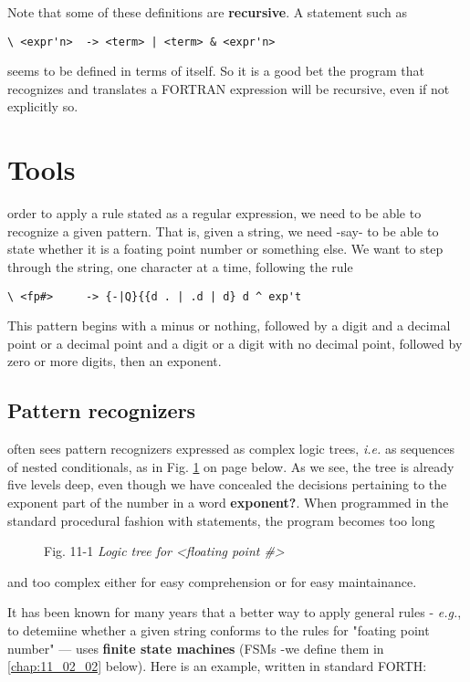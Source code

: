 Note that some of these definitions are \textbf{recursive}. A statement such as

\begin{verbatim}
\ <expr'n>  -> <term> | <term> & <expr'n>
\end{verbatim}

seems to be defined in terms of itself. So it is a good bet the program that recognizes and translates a FORTRAN expression will be recursive, even if not explicitly so.

\section{Tools}
 order to apply a rule stated as a regular expression, we need to be able to recognize a given pattern. That is, given a string, we need -say- to be able to state whether it is a foating point number or something else. We want to step through the string, one character at a time, following the rule

\begin{verbatim}
\ <fp#>     -> {-|Q}{{d . | .d | d} d ^ exp't
\end{verbatim}

This pattern begins with a minus or nothing, followed by a digit and a decimal point or a decimal point and a digit or a digit with no decimal point, followed by zero or more digits, then an exponent.

\subsection{Pattern recognizers}
 often sees pattern recognizers expressed as complex logic trees, \textit{i.e.} as sequences of nested conditionals, as in Fig. \ref{fig:11_01} on page \pageref{fig:11_01} below. As we see, the tree is already five levels deep, even though we have concealed the decisions pertaining to the exponent part of the number in a word \textbf{exponent?}. When programmed in the standard procedural fashion with  statements, the program becomes too long

\begin{figure}
    \caption{Fig. 11-1 \textit{Logic tree for <floating point \#>}}
    \label{fig:11_01}
\end{figure}

and too complex either for easy comprehension or for easy maintainance.

It has been known for many years that a better way to apply general rules - \textit{e.g.}, to detemiine whether a given string conforms to the rules for "foating point number" --- uses \textbf{finite state machines} (FSMs -we define them in \ref{chap:11_02_02} below). Here is an example, written in standard FORTH:

